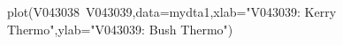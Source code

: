\begin{Schunk}
\begin{Sinput}
 plot(V043038~V043039,data=mydta1,xlab="V043039: Kerry Thermo",ylab="V043039: Bush Thermo")
\end{Sinput}
\end{Schunk}
